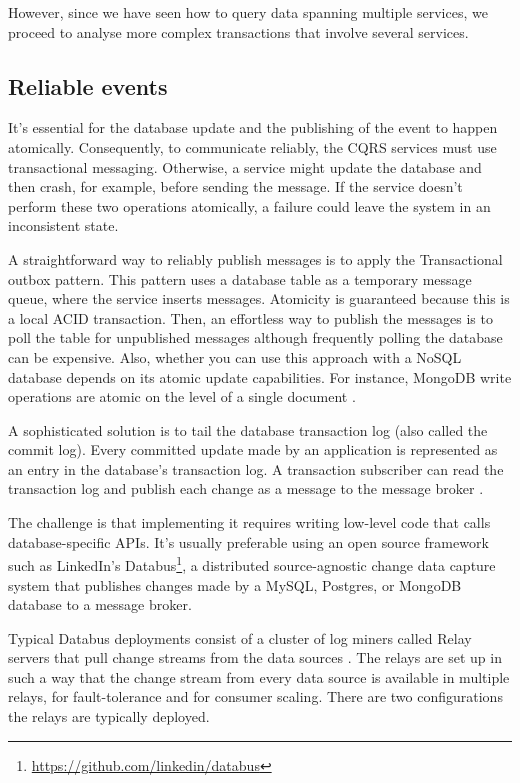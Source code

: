 \documentclass[conference]{IEEEtran}
\begin{document}
However, since we have seen how to query data spanning multiple services, we proceed to analyse more complex transactions that involve several services.

\subsection{Reliable events}

It's essential for the database update and the publishing of the event to happen atomically. Consequently, to communicate reliably, the CQRS services must use transactional messaging. Otherwise, a service might update the database and then crash, for example, before sending the message. If the service doesn't perform these two operations atomically, a failure could leave the system in an inconsistent state.

A straightforward way to reliably publish messages is to apply the Transactional outbox pattern. This pattern uses a database table as a temporary message queue, where the service inserts messages. Atomicity is guaranteed because this is a local ACID transaction. Then, an effortless way to publish the messages is to poll the table for unpublished messages although frequently polling the database can be expensive. Also, whether you can use this approach with a NoSQL database depends on its atomic update capabilities. For instance, MongoDB write operations are atomic on the level of a single document \cite{mongodb-atomic-write}.

A sophisticated solution is to tail the database transaction log (also called the commit log). Every committed update made by an application is represented as an entry in the database's transaction log. A transaction subscriber can read the transaction log and publish each change as a message to the message broker \cite{log-tailing}.

The challenge is that implementing it requires writing low-level code that calls database-specific APIs. It's usually preferable using an open source framework such as LinkedIn's Databus\footnote{\url{https://github.com/linkedin/databus}}, a distributed source-agnostic change data capture system that publishes changes made by a MySQL, Postgres, or MongoDB database to a message broker.

Typical Databus deployments consist of a cluster of log miners called Relay servers that pull change streams from the data sources \cite{databus}. The relays are set up in such a way that the change stream from every data source is available in multiple relays, for fault-tolerance and for consumer scaling. There are two configurations the relays are typically deployed.
\end{document}
